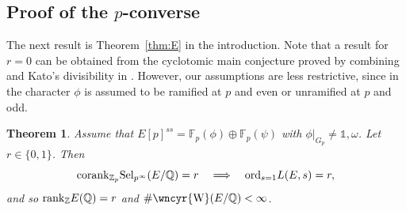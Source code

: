\documentclass[10pt]{amsart}
\newcommand{\sha}{\text{\wncyr{W}}}
\numberwithin{equation}{section}
\newtheorem{theorem}{Theorem}
\theoremstyle{definition}
\theoremstyle{remark}
\newcommand{\Z}{\mathbb{Z}}
\newcommand{\bQ}{\mathbb{Q}}
\newcommand{\Q}{\mathbb{Q}}
\begin{document}
\subsection{Proof of the \texorpdfstring{$p$}{p}-converse} 

The next result is Theorem~\ref{thm:E} in the introduction.
Note that a result for $r=0$ can be obtained from the cyclotomic main conjecture proved by combining \cite[Thm.~1.3]{greenvats} and Kato's divisibility in \cite{kato-euler-systems}. However, our assumptions are less restrictive, since in \cite{greenvats} the character $\phi$ is assumed to be ramified at $p$ and even or unramified at $p$ and odd.
\begin{theorem}\label{thm:thmB}
Assume that $E[p]^{ss}=\mathbb{F}_p(\phi)\oplus\mathbb{F}_p(\psi)$ with $\phi\vert_{G_p}\neq\mathds{1},\omega$. Let $r\in\{0,1\}$. Then 
\[
{\rm corank}_{\Z_p}{\rm Sel}_{p^\infty}(E/\Q) = r 
\quad\Longrightarrow\quad
{\rm ord}_{s=1}L(E,s)=r,
\]
and so ${\rm rank}_\Z E(\Q)=r$ and $\#\sha(E/\Q)<\infty$.
\end{theorem}
\end{document}
